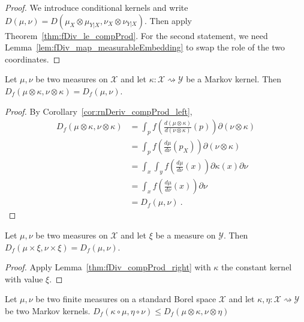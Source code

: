\begin{proof}\leanok
{}
We introduce conditional kernels and write $D(\mu, \nu) = D(\mu_X \otimes \mu_{Y|X}, \nu_X \otimes \nu_{Y|X})$. Then apply Theorem~\ref{thm:fDiv_le_compProd}.
For the second statement, we need Lemma~\ref{lem:fDiv_map_measurableEmbedding} to swap the role of the two coordinates.
\end{proof}

\begin{lemma}
  \label{thm:fDiv_compProd_right}
  \leanok
  Let $\mu, \nu$ be two measures on $\mathcal X$ and let $\kappa : \mathcal X \rightsquigarrow \mathcal Y$ be a Markov kernel.
  Then $D_f(\mu \otimes \kappa, \nu \otimes \kappa) = D_f(\mu, \nu)$.
\end{lemma}

\begin{proof}\leanok
{}
By Corollary~\ref{cor:rnDeriv_compProd_left},
\begin{align*}
D_f(\mu \otimes \kappa, \nu \otimes \kappa)
&= \int_{p} f\left(\frac{d (\mu \otimes \kappa)}{d (\nu \otimes \kappa)}(p)\right) \partial(\nu \otimes \kappa)
\\
&= \int_{p} f\left(\frac{d \mu}{d \nu}(p_X)\right) \partial(\nu \otimes \kappa)
\\
&= \int_x \int_y f\left(\frac{d \mu}{d \nu}(x)\right) \partial \kappa(x) \partial \nu
\\
&= \int_x f\left(\frac{d \mu}{d \nu}(x)\right) \partial \nu
\\
&= D_f(\mu, \nu)
\: .
\end{align*}
\end{proof}

\begin{corollary}
  \label{cor:fDiv_prod_right}
  Let $\mu, \nu$ be two measures on $\mathcal X$ and let $\xi$ be a measure on $\mathcal Y$.
  Then $D_f(\mu \times \xi, \nu \times \xi) = D_f(\mu, \nu)$.
\end{corollary}

\begin{proof}
Apply Lemma~\ref{thm:fDiv_compProd_right} with $\kappa$ the constant kernel with value $\xi$.
\end{proof}

\begin{lemma}
  \label{lem:fDiv_comp_le_compProd}
  \leanok
  Let $\mu, \nu$ be two finite measures on a standard Borel space $\mathcal X$ and let $\kappa, \eta : \mathcal X \rightsquigarrow \mathcal Y$ be two Markov kernels.
  $D_f(\kappa \circ \mu, \eta \circ \nu) \le D_f(\mu \otimes \kappa, \nu \otimes \eta)$
\end{lemma}

